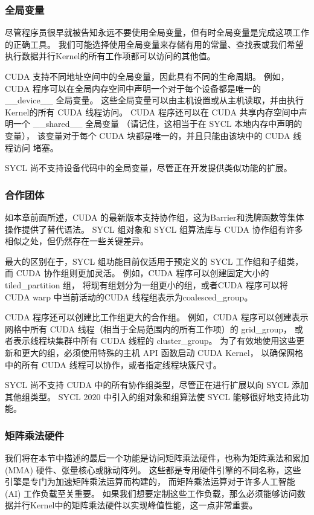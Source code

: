 \subsubsection{全局变量}
尽管程序员很早就被告知永远不要使用全局变量，但有时全局变量是完成这项工作的正确工具。 
我们可能选择使用全局变量来存储有用的常量、查找表或我们希望执行数据并行Kernel的所有工作项都可以访问的其他值。

CUDA 支持不同地址空间中的全局变量，因此具有不同的生命周期。 
例如，CUDA 程序可以在全局内存空间中声明一个对于每个设备都是唯一的 \_\_device\_\_ 全局变量。 
这些全局变量可以由主机设置或从主机读取，并由执行Kernel的所有 CUDA 线程访问。 
CUDA 程序还可以在 CUDA 共享内存空间中声明一个 \_\_shared\_\_ 全局变量
（请记住，这相当于在 SYCL 本地内存中声明的变量），
该变量对于每个 CUDA 块都是唯一的，并且只能由该块中的 CUDA 线程访问 堵塞。

SYCL 尚不支持设备代码中的全局变量，尽管正在开发提供类似功能的扩展。

\subsubsection{合作团体}
如本章前面所述，CUDA 的最新版本支持协作组，这为Barrier和洗牌函数等集体操作提供了替代语法。 
SYCL 组对象和 SYCL 组算法库与 CUDA 协作组有许多相似之处，但仍然存在一些关键差异。

最大的区别在于，SYCL 组功能目前仅适用于预定义的 SYCL 工作组和子组类，而 CUDA 协作组则更加灵活。 
例如，CUDA 程序可以创建固定大小的tiled\_partition 组，
将现有组划分为一组更小的组，或者CUDA 程序可以将CUDA warp 中当前活动的CUDA 线程组表示为coalesced\_group。

CUDA 程序还可以创建比工作组更大的合作组。 
例如，CUDA 程序可以创建表示网格中所有 CUDA 线程（相当于全局范围内的所有工作项）的 grid\_group，
或者表示线程块集群中所有 CUDA 线程的 cluster\_group。 
为了有效地使用这些更新和更大的组，必须使用特殊的主机 API 函数启动 CUDA Kernel，
以确保网格中的所有 CUDA 线程可以协作，或者指定线程块簇尺寸。

SYCL 尚不支持 CUDA 中的所有协作组类型，尽管正在进行扩展以向 SYCL 添加其他组类型。 
SYCL 2020 中引入的组对象和组算法使 SYCL 能够很好地支持此功能。

\subsubsection{矩阵乘法硬件}
我们将在本节中描述的最后一个功能是访问矩阵乘法硬件，也称为矩阵乘法和累加 (MMA) 硬件、张量核心或脉动阵列。 
这些都是专用硬件引擎的不同名称，这些引擎是专门为加速矩阵乘法运算而构建的，
而矩阵乘法运算对于许多人工智能 (AI) 工作负载至关重要。 
如果我们想要定制这些工作负载，那么必须能够访问数据并行Kernel中的矩阵乘法硬件以实现峰值性能，这一点非常重要。

